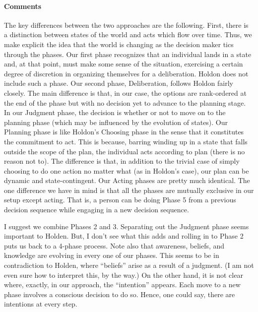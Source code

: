 \documentclass[
11pt,
titlepage,
reqno,
]{article}%
\theoremstyle{definition}
\begin{document}
	\paragraph{Comments} The key differences between the two approaches are the following. 
	First, there is a distinction between states of the world and acts which flow over time. 
	Thus, we make explicit the idea that the world is changing as the decision maker tics through the phases. 
	Our first phase recognizes that an individual lands in a state and, at that point, must make some sense of the situation, exercising a certain degree of discretion in  organizing themselves for a deliberation. Holdon does not include such a phase. 
	Our second phase, Deliberation, follows Holdon fairly closely. 
	The main difference is that, in our case, the options are rank-ordered at the end of the phase but with no decision yet to advance to the planning stage. 
	In our Judgment phase, the decision is whether or not to move on to the planning phase (which may be influenced by the evolution of states). 
	Our Planning phase is like Holdon's Choosing phase in the sense that it constitutes the commitment to act. 
	This is because, barring winding up in a state that falls outside the scope of the plan, the individual acts according to plan (there is no reason not to). 
	The difference is that, in addition to the trivial case of simply choosing to do one action no matter what (as in Holdon's case), our plan can be dynamic and state-contingent. 
	Our Acting phases are pretty much identical. The one difference we have in mind is that all the phases are mutually exclusive in our setup except acting. 
	That is, a person can be doing Phase 5 from a previous decision sequence while engaging in a new decision sequence.  
	
	I suggest we combine Phases 2 and 3. Separating out the Judgment phase seems important to Holden. 
	But, I don't see what this adds and rolling in to Phase 2 puts us back to a 4-phase process. 
	Note also that awareness, beliefs, and knowledge are evolving in every one of our phases. 
	This seems to be in contradiction to Holden, where ``beliefs'' arise as a result of a judgment. 
	(I am not even sure how to interpret this, by the way.) 
	On the other hand, it is not clear where, exactly, in our approach, the ``intention'' appears. 
	Each move to a new phase involves a conscious decision to do so. 
	Hence, one could say, there are intentions at every step.
	
\end{document}
